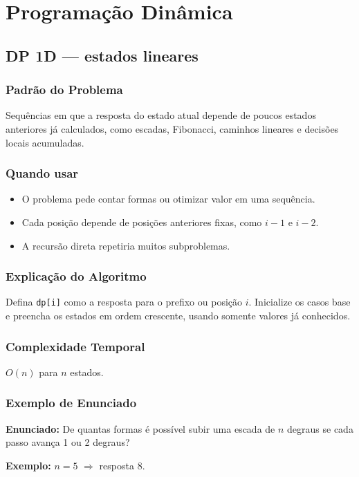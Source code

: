 \chapter{Programação Dinâmica}

\section{DP 1D --- estados lineares}

\subsection{Padrão do Problema}
Sequências em que a resposta do estado atual depende de poucos estados anteriores já calculados, como escadas, Fibonacci, caminhos lineares e decisões locais acumuladas.

\subsection{Quando usar}
\begin{itemize}[nosep]
  \item O problema pede contar formas ou otimizar valor em uma sequência.
  \item Cada posição depende de posições anteriores fixas, como $i-1$ e $i-2$.
  \item A recursão direta repetiria muitos subproblemas.
\end{itemize}

\subsection{Explicação do Algoritmo}
Defina \texttt{dp[i]} como a resposta para o prefixo ou posição $i$. Inicialize os casos base e preencha os estados em ordem crescente, usando somente valores já conhecidos.

\subsection{Complexidade Temporal}
$O(n)$ para $n$ estados.

\subsection{Exemplo de Enunciado}
\begin{exemplodiabox}
\textbf{Enunciado:} De quantas formas é possível subir uma escada de $n$ degraus se cada passo avança 1 ou 2 degraus?

\textbf{Exemplo:} $n = 5$ $\Rightarrow$ resposta $8$.
\end{exemplodiabox}

